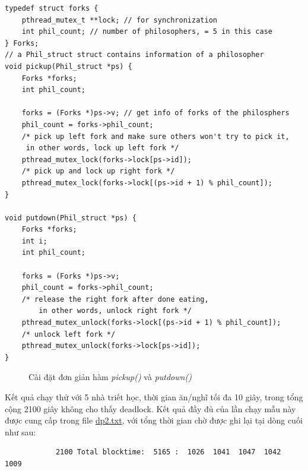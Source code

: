 \documentclass{article}
\begin{document}
\begin{shaded}
    \begin{lstlisting}
typedef struct forks {
    pthread_mutex_t **lock; // for synchronization
    int phil_count; // number of philosophers, = 5 in this case
} Forks;
// a Phil_struct struct contains information of a philosopher
void pickup(Phil_struct *ps) { 
    Forks *forks;
    int phil_count;

    forks = (Forks *)ps->v; // get info of forks of the philosphers
    phil_count = forks->phil_count;   
    /* pick up left fork and make sure others won't try to pick it, 
     in other words, lock up left fork */
    pthread_mutex_lock(forks->lock[ps->id]); 
    /* pick up and lock up right fork */
    pthread_mutex_lock(forks->lock[(ps->id + 1) % phil_count]); 
}

void putdown(Phil_struct *ps) {
    Forks *forks;
    int i;
    int phil_count;

    forks = (Forks *)ps->v;
    phil_count = forks->phil_count;    
    /* release the right fork after done eating, 
        in other words, unlock right fork */
    pthread_mutex_unlock(forks->lock[(ps->id + 1) % phil_count]); 
    /* unlock left fork */
    pthread_mutex_unlock(forks->lock[ps->id]);                    
}
    \end{lstlisting}
\end{shaded}

\begin{figure}[h]
    \centering
    \caption{Cài đặt đơn giản hàm \textit{pickup()} và \textit{putdown()}}
\end{figure}

Kết quả chạy thử với 5 nhà triết học, thời gian ăn/nghĩ tối đa 10 giây, trong tổng cộng 2100 giây
không cho thấy deadlock. Kết quả đầy đủ của lần chạy mẫu này được cung cấp trong file \href{https://github.com/dont-penciler/INT2214/blob/main/a2/written/dp2.txt}{dp2.txt},
với tổng thời gian chờ được ghi lại tại dòng cuối như sau:
\begin{verbatim}
            2100 Total blocktime:  5165 :  1026  1041  1047  1042  1009
\end{verbatim}
\end{document}
